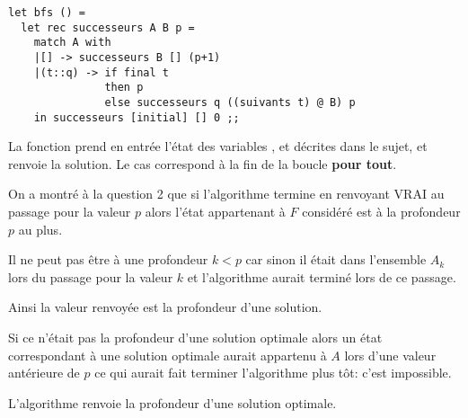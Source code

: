 \begin{Exercise} 
\begin{lstlisting}
let bfs () = 
  let rec successeurs A B p = 
    match A with 
    |[] -> successeurs B [] (p+1) 
    |(t::q) -> if final t 
               then p 
               else successeurs q ((suivants t) @ B) p
    in successeurs [initial] [] 0 ;; 
\end{lstlisting}
La fonction  prend en entrée l'état des variables , 
et  décrites dans le sujet, et renvoie la solution. Le cas 
correspond à la fin de la boucle {\bf pour tout}. 
\end{Exercise}
\newpage
\begin{Exercise} 
On a montré à la question 2 que si l'algorithme termine en renvoyant VRAI au passage pour la valeur $p$ alors l'état appartenant à $F$ considéré est à la profondeur $p$ au plus.

Il ne peut pas être à une profondeur $k<p$ car sinon il était dans l'ensemble $A_k$ lors du passage pour la valeur $k$ et l'algorithme aurait terminé lors de ce passage. 

Ainsi la valeur renvoyée est la profondeur d'une solution.

Si ce n'était pas la profondeur d'une solution optimale alors un état correspondant à une solution optimale aurait appartenu à $A$ lors d'une valeur antérieure de $p$ ce qui aurait fait terminer l'algorithme plus tôt: c'est impossible.

L'algorithme renvoie la profondeur d'une solution optimale.
\end{Exercise}
